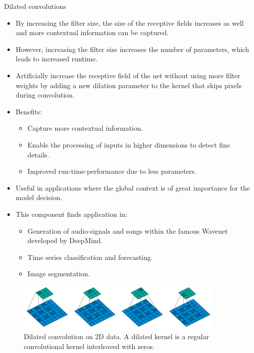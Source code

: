 \begin{vbframe}{Dilated convolutions}
\framebreak 

\begin{itemize}
        \item By increasing the filter size, the size of the receptive fields increases as well and more contextual information can be captured.
        \item However, increasing the filter size increases the number of parameters, which leads to increased runtime. 
        \item Artificially increase the receptive field of the net without using more filter weights by adding a new dilation parameter to the kernel that skips pixels during convolution.
        \item Benefits:
        \begin{itemize}
            \item Capture more contextual information. 
            \item Enable the processing of inputs in higher dimensions to detect fine details. 
            \item Improved run-time-performance due to less parameters.
        \end{itemize}
    \end{itemize}

    \vspace*{-0.9cm}
 

\framebreak

\begin{itemize}
        \item Useful in applications where the global context is of great importance for the model decision.
        \item This component finds application in:
        \begin{itemize}
            \item Generation of audio-signals and songs within the famous Wavenet developed by DeepMind.
            \item Time series classification and forecasting.
            \item Image segmentation.
        \end{itemize}
    \end{itemize}

    \begin{figure}
        \centering
        \includegraphics[width=10cm]{plots/05_conv_variations/dilated/dilation_nice.png}
        \caption{Dilated convolution on 2D data. A dilated kernel is a regular convolutional kernel interleaved with zeros. } 
    \end{figure}



\end{vbframe}
